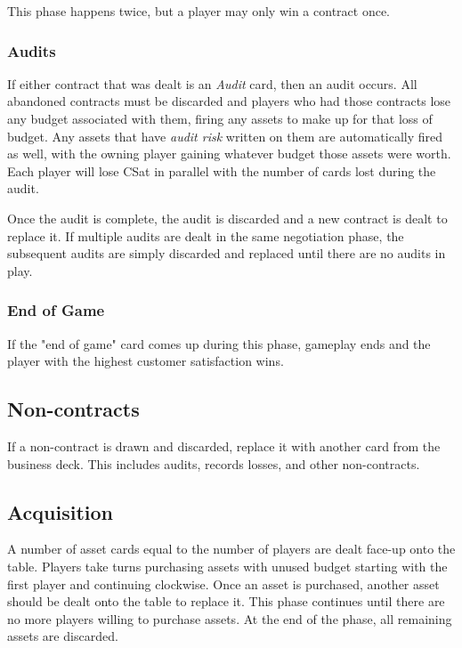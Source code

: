 \documentclass[twocolumn]{article}
\begin{document}
This phase happens twice, but a player may only win a contract once.

\subsubsection*{Audits}

If either contract that was dealt is an \emph{Audit} card, then an audit occurs. All abandoned contracts must be discarded and players who had those contracts lose any budget associated with them, firing any assets to make up for that loss of budget. Any assets that have \emph{audit risk} written on them are automatically fired as well, with the owning player gaining whatever budget those assets were worth. Each player will lose CSat in parallel with the number of cards lost during the audit.

Once the audit is complete, the audit is discarded and a new contract is dealt to replace it. If multiple audits are dealt in the same negotiation phase, the subsequent audits are simply discarded and replaced until there are no audits in play.

\subsubsection*{End of Game}

If the "end of game" card comes up during this phase, gameplay ends and the player with the highest customer satisfaction wins.

\subsection*{Non-contracts}

If a non-contract is drawn and discarded, replace it with another card from the business deck. This includes audits, records losses, and other non-contracts.

\subsection*{Acquisition}

A number of asset cards equal to the number of players are dealt face-up onto the table. Players take turns purchasing assets with unused budget starting with the first player and continuing clockwise. Once an asset is purchased, another asset should be dealt onto the table to replace it. This phase continues until there are no more players willing to purchase assets. At the end of the phase, all remaining assets are discarded.
\end{document}
